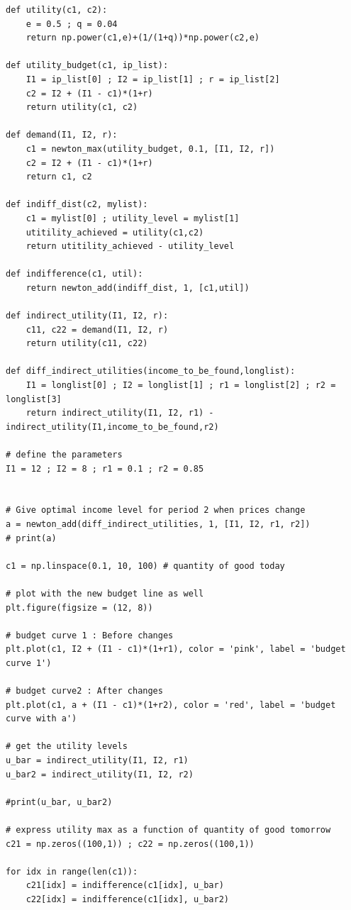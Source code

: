 \documentclass[a4paper, 12pt, reqno]{article}
\begin{document}
\begin{lstlisting}[frame=single]
    def utility(c1, c2):
    e = 0.5 ; q = 0.04
    return np.power(c1,e)+(1/(1+q))*np.power(c2,e)

def utility_budget(c1, ip_list):
    I1 = ip_list[0] ; I2 = ip_list[1] ; r = ip_list[2]
    c2 = I2 + (I1 - c1)*(1+r)
    return utility(c1, c2)
    
def demand(I1, I2, r):
    c1 = newton_max(utility_budget, 0.1, [I1, I2, r])
    c2 = I2 + (I1 - c1)*(1+r)
    return c1, c2

def indiff_dist(c2, mylist): 
    c1 = mylist[0] ; utility_level = mylist[1]
    utitility_achieved = utility(c1,c2)
    return utitility_achieved - utility_level

def indifference(c1, util):
    return newton_add(indiff_dist, 1, [c1,util])

def indirect_utility(I1, I2, r):
    c11, c22 = demand(I1, I2, r)
    return utility(c11, c22)

def diff_indirect_utilities(income_to_be_found,longlist):
    I1 = longlist[0] ; I2 = longlist[1] ; r1 = longlist[2] ; r2 = longlist[3]
    return indirect_utility(I1, I2, r1) - indirect_utility(I1,income_to_be_found,r2)

# define the parameters
I1 = 12 ; I2 = 8 ; r1 = 0.1 ; r2 = 0.85


# Give optimal income level for period 2 when prices change
a = newton_add(diff_indirect_utilities, 1, [I1, I2, r1, r2])
# print(a)

c1 = np.linspace(0.1, 10, 100) # quantity of good today

# plot with the new budget line as well
plt.figure(figsize = (12, 8))

# budget curve 1 : Before changes
plt.plot(c1, I2 + (I1 - c1)*(1+r1), color = 'pink', label = 'budget curve 1')

# budget curve2 : After changes
plt.plot(c1, a + (I1 - c1)*(1+r2), color = 'red', label = 'budget curve with a')

# get the utility levels
u_bar = indirect_utility(I1, I2, r1) 
u_bar2 = indirect_utility(I1, I2, r2)

#print(u_bar, u_bar2)

# express utility max as a function of quantity of good tomorrow
c21 = np.zeros((100,1)) ; c22 = np.zeros((100,1))

for idx in range(len(c1)):
    c21[idx] = indifference(c1[idx], u_bar)
    c22[idx] = indifference(c1[idx], u_bar2)


\end{lstlisting}
\end{document}

